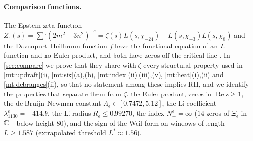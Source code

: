 \documentclass[11pt]{article}
\theoremstyle{definition}\newtheorem{definition}[theorem]{Definition}
\theoremstyle{remark}\newtheorem{remark}[theorem]{Remark}
\renewcommand{\Re}{\operatorname{Re}}\renewcommand{\Im}{\operatorname{Im}}
\begin{document}
\paragraph{Comparison functions.} The Epstein zeta function $Z_\epsilon(s)=\sum'(2m^2+3n^2)^{-s}=\zeta(s)L(s,\chi_{-24})-L(s,\chi_{-3})L(s,\chi_8)$ and the Davenport--Heilbronn function $f$ have the functional equation of an $L$-function and no Euler product, and both have zeros off the critical line \cite{DH,Spira}. In \cref{sec:compare} we prove that they share with $\zeta$ every structural property used in \cref{mt:updraft}(i), \cref{mt:six}(a),(b), \cref{mt:index}(ii),(iii),(v), \cref{mt:heat}(i),(ii) and \cref{mt:debranges}(ii), so that no statement among these implies RH, and we identify the properties that separate them from $\zeta$: the Euler product, zeros in $\Re s\ge1$, the de Bruijn--Newman constant $\Lambda_\epsilon\in[0.7472,5.12]$, the Li coefficient $\lambda^\epsilon_{1130}=-414.9$, the Li radius $R_\epsilon\le0.99270$, the index $N_+^\epsilon=\infty$ ($14$ zeros of $\Xi_\epsilon$ in $\mathbb C_+$ below height $80$), and the sign of the Weil form on windows of length $L\ge1.587$ (extrapolated threshold $L^*\approx1.56$).
\end{document}
